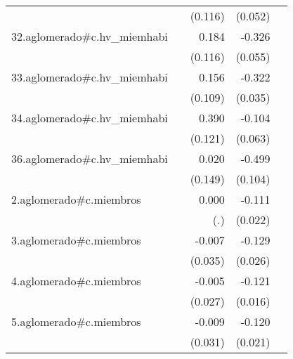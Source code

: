 {\begin{longtable}{l*{4}{D{.}{.}{-1}}}
            &                     &     (0.116)         &     (0.052)         &                     \\
\addlinespace
32.aglomerado#c.hv\_miemhabi&                     &       0.184         &      -0.326\sym{***}&                     \\
            &                     &     (0.116)         &     (0.055)         &                     \\
\addlinespace
33.aglomerado#c.hv\_miemhabi&                     &       0.156         &      -0.322\sym{***}&                     \\
            &                     &     (0.109)         &     (0.035)         &                     \\
\addlinespace
34.aglomerado#c.hv\_miemhabi&                     &       0.390\sym{**} &      -0.104         &                     \\
            &                     &     (0.121)         &     (0.063)         &                     \\
\addlinespace
36.aglomerado#c.hv\_miemhabi&                     &       0.020         &      -0.499\sym{***}&                     \\
            &                     &     (0.149)         &     (0.104)         &                     \\
\addlinespace
2.aglomerado#c.miembros&                     &       0.000         &      -0.111\sym{***}&                     \\
            &                     &         (.)         &     (0.022)         &                     \\
\addlinespace
3.aglomerado#c.miembros&                     &      -0.007         &      -0.129\sym{***}&                     \\
            &                     &     (0.035)         &     (0.026)         &                     \\
\addlinespace
4.aglomerado#c.miembros&                     &      -0.005         &      -0.121\sym{***}&                     \\
            &                     &     (0.027)         &     (0.016)         &                     \\
\addlinespace
5.aglomerado#c.miembros&                     &      -0.009         &      -0.120\sym{***}&                     \\
            &                     &     (0.031)         &     (0.021)         &                     \\

\end{longtable}}
